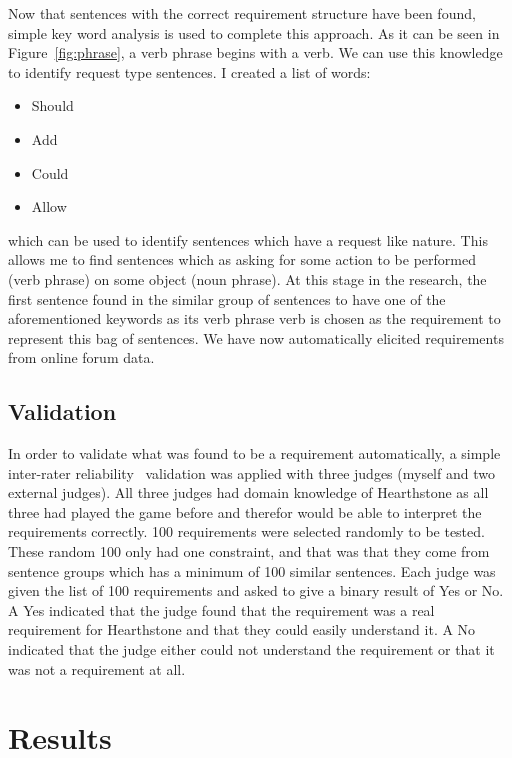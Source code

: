 \documentclass[conference]{IEEEtran}
\begin{document}
Now that sentences with the correct requirement structure have been found, simple key word analysis is used
to complete this approach. As it can be seen in Figure~\ref{fig:phrase}, a verb phrase begins with a verb.
We can use this knowledge to identify request type sentences. I created a list of words:

\begin{itemize}
  \item Should
  \item Add
  \item Could
  \item Allow
\end{itemize}

which can be used to identify sentences which have a request like nature. This allows me to find sentences
which as asking for some action to be performed (verb phrase) on some object (noun phrase). At this
stage in the research, the first sentence found in the similar group of sentences to have one of the aforementioned
keywords as its verb phrase verb is chosen as the requirement to represent this bag of sentences. We have
now automatically elicited requirements from online forum data.

\subsection{Validation}

In order to validate what was found to be a requirement automatically, a simple inter-rater reliability~\cite{gwet2001handbook}
validation was applied
with three judges (myself and two external judges). All three judges had domain knowledge of Hearthstone as all three
had played the game before and therefor would be able to interpret the requirements correctly. 100 requirements were selected randomly
to be tested. These random 100 only had one constraint, and that was that they come from sentence groups
which has a minimum of 100 similar sentences. Each judge was given the list of 100 requirements and asked to give a binary result of Yes or No. A Yes
indicated that the judge found that the requirement was a real requirement for Hearthstone and that they could easily
understand it. A No indicated that the judge either could not understand the requirement or that it was not a requirement
at all.

\section{Results}
\end{document}
